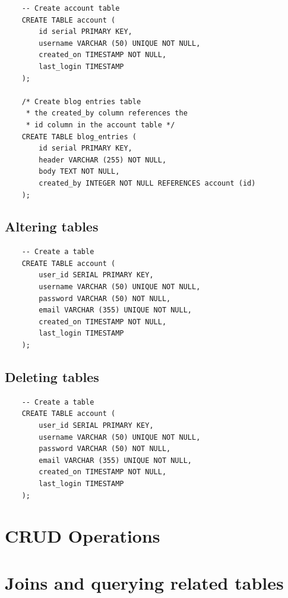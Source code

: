 \begin{verbatim}
    -- Create account table
    CREATE TABLE account (
        id serial PRIMARY KEY,
        username VARCHAR (50) UNIQUE NOT NULL,
        created_on TIMESTAMP NOT NULL, 
        last_login TIMESTAMP
    );
    
    /* Create blog entries table
     * the created_by column references the 
     * id column in the account table */
    CREATE TABLE blog_entries (
        id serial PRIMARY KEY, 
        header VARCHAR (255) NOT NULL,
        body TEXT NOT NULL,
        created_by INTEGER NOT NULL REFERENCES account (id)
    );
\end{verbatim}

\subsection{Altering tables}
\begin{verbatim}
    -- Create a table
    CREATE TABLE account (
        user_id SERIAL PRIMARY KEY,
        username VARCHAR (50) UNIQUE NOT NULL,
        password VARCHAR (50) NOT NULL,
        email VARCHAR (355) UNIQUE NOT NULL,
        created_on TIMESTAMP NOT NULL,
        last_login TIMESTAMP
    );
\end{verbatim}

\subsection{Deleting tables}
\begin{verbatim}
    -- Create a table
    CREATE TABLE account (
        user_id SERIAL PRIMARY KEY,
        username VARCHAR (50) UNIQUE NOT NULL,
        password VARCHAR (50) NOT NULL,
        email VARCHAR (355) UNIQUE NOT NULL,
        created_on TIMESTAMP NOT NULL,
        last_login TIMESTAMP
    );
\end{verbatim}

\section{CRUD Operations}

\section{Joins and querying related tables}

